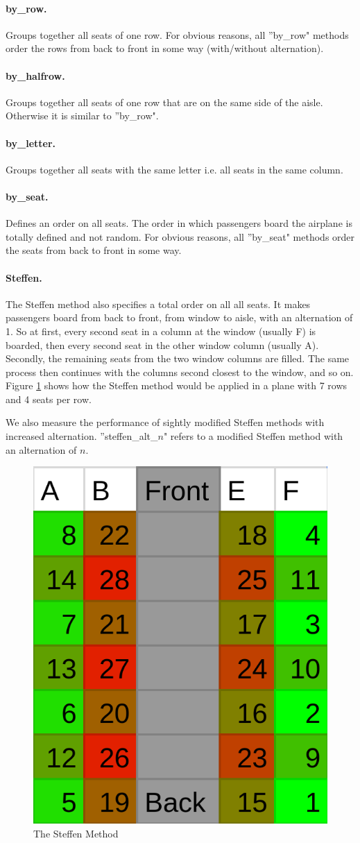 \documentclass[11pt]{article}
\begin{document}
\paragraph{by\_row.} Groups together all seats of one row. For obvious reasons, all ''by\_row" methods order the rows from back to front in some way (with/without alternation).

\paragraph{by\_halfrow.} Groups together all seats of one row that are on the same side of the aisle. Otherwise it is similar to ''by\_row".

\paragraph{by\_letter.} Groups together all seats with the same letter i.e. all seats in the same column.

\paragraph{by\_seat.} Defines an order on all seats. The order in which passengers board the airplane is totally defined and not random. For obvious reasons, all ''by\_seat" methods order the seats from back to front in some way.

\paragraph{Steffen.}
The Steffen method also specifies a total order on all all seats. It makes passengers board from back to front, from window to aisle, with an alternation of 1. So at first, every second seat in a column at the window (usually F) is boarded, then every second seat in the other window column (usually A). Secondly, the remaining seats from the two window columns are filled. The same process then continues with the columns second closest to the window, and so on. Figure \ref{fig:steffen} shows how the Steffen method would be applied in a plane with 7 rows and 4 seats per row.


We also measure the performance of sightly modified Steffen methods with increased alternation. ''steffen\_alt\_$n$" refers to a modified Steffen method with an alternation of $n$.

\begin{figure}
	\center
	\label{fig:steffen}
	\includegraphics[width=0.3\linewidth]{images/steffen.png}
	\caption{The Steffen Method}
\end{figure}
\end{document}
